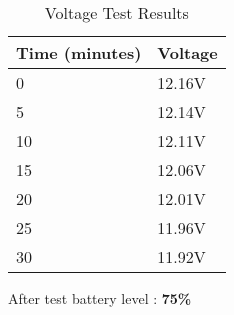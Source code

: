 \begin{table}[H]
	\centering
	\caption{Voltage Test Results}
	\begin{tabular}{ll}
	\hline
	\textbf{Time (minutes)} & \textbf{Voltage}\\
	\hline
    0 & 12.16V \\
    5 & 12.14V \\
    10 & 12.11V \\
    15 & 12.06V \\
    20 & 12.01V \\
    25 & 11.96V \\
    30 & 11.92V \\
	\hline
	\end{tabular}
\end{table}
\centering
After test battery level : \textbf{75\%}

